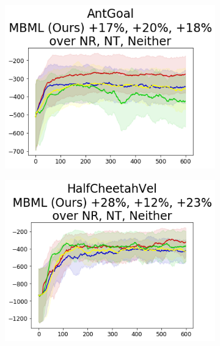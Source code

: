 \begin{figure}[!t]
\begin{minipage}{0.70\textwidth}
{            \begin{subfigure}{\mujocobaselinefigsize\paperwidth}
                \includegraphics[width=\linewidth]{chapter_2/fig/wd-ablation-AntGoal.png}
            \end{subfigure}

            \begin{subfigure}{\mujocobaselinefigsize\paperwidth}
                \includegraphics[width=\linewidth]{chapter_2/fig/wd-ablation-HalfCheetahVel.png}
            \end{subfigure}}


\end{minipage}
\end{figure}
